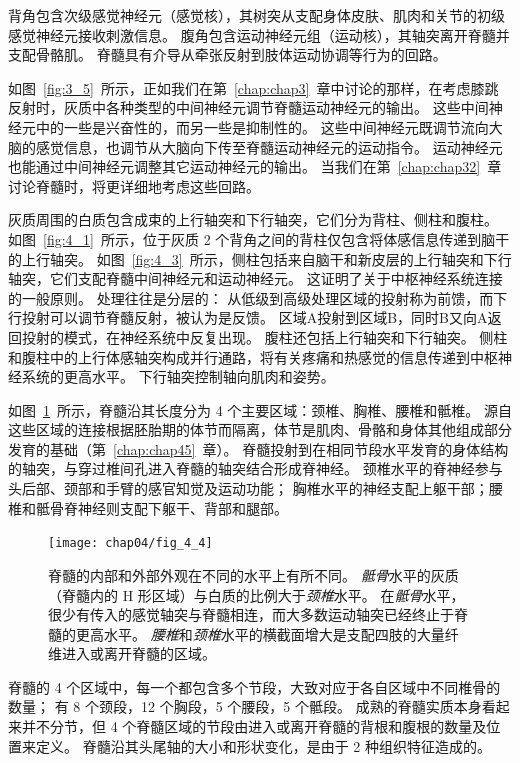 背角包含次级感觉神经元（感觉核），其树突从支配身体皮肤、肌肉和关节的初级感觉神经元接收刺激信息。
腹角包含运动神经元组（运动核），其轴突离开脊髓并支配骨骼肌。
脊髓具有介导从牵张反射到肢体运动协调等行为的回路。


如图~\ref{fig:3_5}~所示，正如我们在第~\ref{chap:chap3}~章中讨论的那样，在考虑膝跳反射时，灰质中各种类型的中间神经元调节脊髓运动神经元的输出。 
这些中间神经元中的一些是兴奋性的，而另一些是抑制性的。
这些中间神经元既调节流向大脑的感觉信息，也调节从大脑向下传至脊髓运动神经元的运动指令。
运动神经元也能通过中间神经元调整其它运动神经元的输出。
当我们在第~\ref{chap:chap32}~章讨论脊髓时，将更详细地考虑这些回路。


灰质周围的白质包含成束的上行轴突和下行轴突，它们分为背柱、侧柱和腹柱。
如图~\ref{fig:4_1}~所示，位于灰质 2 个背角之间的背柱仅包含将体感信息传递到脑干的上行轴突。
如图~\ref{fig:4_3}~所示，侧柱包括来自脑干和新皮层的上行轴突和下行轴突，它们支配脊髓中间神经元和运动神经元。
这证明了关于中枢神经系统连接的一般原则。
处理往往是分层的：
从低级到高级处理区域的投射称为前馈，而下行投射可以调节脊髓反射，被认为是反馈。 
区域A投射到区域B，同时B又向A返回投射的模式，在神经系统中反复出现。
腹柱还包括上行轴突和下行轴突。
侧柱和腹柱中的上行体感轴突构成并行通路，将有关疼痛和热感觉的信息传递到中枢神经系统的更高水平。
下行轴突控制轴向肌肉和姿势。


如图~\ref{fig:4_4}~所示，脊髓沿其长度分为 4 个主要区域：颈椎、胸椎、腰椎和骶椎。
源自这些区域的连接根据胚胎期的体节而隔离，体节是肌肉、骨骼和身体其他组成部分发育的基础（第~\ref{chap:chap45}~章）。
脊髓投射到在相同节段水平发育的身体结构的轴突，与穿过椎间孔进入脊髓的轴突结合形成脊神经。
颈椎水平的脊神经参与头后部、颈部和手臂的感官知觉及运动功能；
胸椎水平的神经支配上躯干部；腰椎和骶骨脊神经则支配下躯干、背部和腿部。


\begin{figure}[htbp]
	\centering
	\texttt{[image: chap04/fig\_4\_4]}
	\caption{脊髓的内部和外部外观在不同的水平上有所不同。
		\textit{骶骨}水平的灰质（脊髓内的 H 形区域）与白质的比例大于\textit{颈椎}水平。
		在\textit{骶骨}水平，很少有传入的感觉轴突与脊髓相连，而大多数运动轴突已经终止于脊髓的更高水平。
		\textit{腰椎}和\textit{颈椎}水平的横截面增大是支配四肢的大量纤维进入或离开脊髓的区域。}
	\label{fig:4_4}
\end{figure}


脊髓的 4 个区域中，每一个都包含多个节段，大致对应于各自区域中不同椎骨的数量；
有 8 个颈段，12 个胸段，5 个腰段，5 个骶段。
成熟的脊髓实质本身看起来并不分节，但 4 个脊髓区域的节段由进入或离开脊髓的背根和腹根的数量及位置来定义。
脊髓沿其头尾轴的大小和形状变化，是由于 2 种组织特征造成的。


